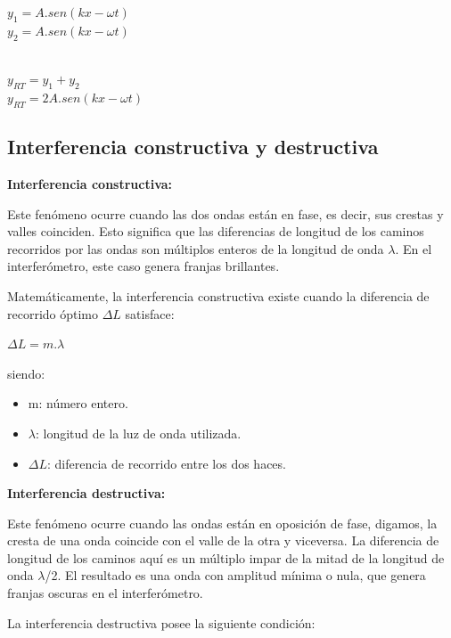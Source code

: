 \documentclass[a4paper]{article}
\begin{document}
		\begin{center}
			${y_1} = A.sen(kx - \omega t)$ \\ 
			${y_2} = A.sen(kx - \omega t)$ \\ \
			
			${y_{RT}} = {y_1} + {y_2}$ \\
			${y_{RT}} = 2A.sen(kx - \omega t)$ \\
		\end{center}
		
		\subsection{Interferencia constructiva y destructiva} 
		\textbf{Interferencia constructiva:}
		
		\indent Este fenómeno ocurre cuando las dos ondas están en fase, es decir, sus crestas y valles coinciden. Esto significa que las diferencias de longitud de los caminos recorridos por las ondas son múltiplos enteros de la longitud de onda $\lambda$. En el interferómetro, este caso genera franjas brillantes.
		
		\indent Matemáticamente, la interferencia constructiva existe cuando la diferencia de recorrido óptimo $\Delta L$ satisface:
		
		\begin{center}
			$\Delta L = m . \lambda$ \\
		\end{center}
		
		siendo:
		\begin{itemize}
			\item m: número entero. 
			\item $\lambda$: longitud de la luz de onda utilizada. 
			\item $\Delta L$: diferencia de recorrido entre los dos haces. \\
		\end{itemize} 
				
		\textbf{Interferencia destructiva:}
		
		\indent Este fenómeno ocurre cuando las ondas están en oposición de fase, digamos, la cresta de una onda coincide con el valle de la otra y viceversa. La diferencia de longitud de los caminos aquí es un múltiplo impar de la mitad de la longitud de onda $\lambda$/2. El resultado es una onda con amplitud mínima o nula, que genera franjas oscuras en el interferómetro.
		
		\indent La interferencia destructiva posee la siguiente condición:
		
\end{document}

